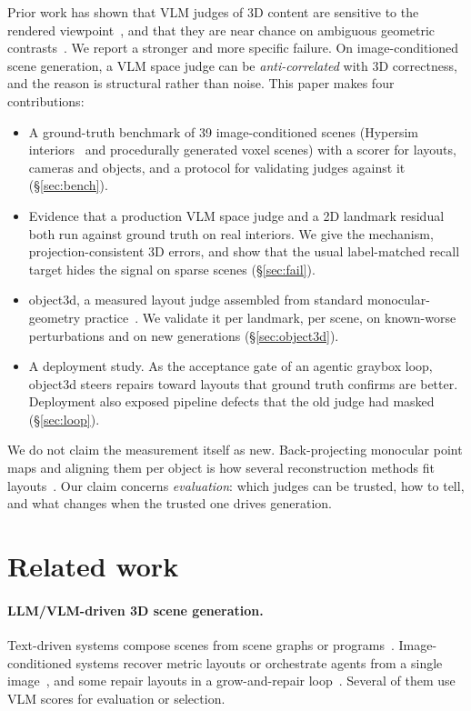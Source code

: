 \documentclass[10pt,twocolumn]{article}
\begin{document}
Prior work has shown that VLM judges of 3D content are sensitive to the rendered viewpoint~\cite{scenecritic}, and that they are near
chance on ambiguous geometric contrasts~\cite{crossmodeljudge}. We report a stronger and more specific failure. On image-conditioned
scene generation, a VLM space judge can be \emph{anti-correlated} with 3D correctness, and the reason is structural rather than
noise. This paper makes four contributions:
\begin{itemize}\setlength\itemsep{1pt}
\item A ground-truth benchmark of 39 image-conditioned scenes (Hypersim interiors~\cite{hypersim} and procedurally generated voxel
scenes) with a scorer for layouts, cameras and objects, and a protocol for validating judges against it (\S\ref{sec:bench}).
\item Evidence that a production VLM space judge and a 2D landmark residual both run against ground truth on real interiors. We give
the mechanism, projection-consistent 3D errors, and show that the usual label-matched recall target hides the signal on sparse scenes
(\S\ref{sec:fail}).
\item object3d, a measured layout judge assembled from standard monocular-geometry practice~\cite{moge2,furnset,mirascene}. We validate
it per landmark, per scene, on known-worse perturbations and on new generations (\S\ref{sec:object3d}).
\item A deployment study. As the acceptance gate of an agentic graybox loop, object3d steers repairs toward layouts that ground truth
confirms are better. Deployment also exposed pipeline defects that the old judge had masked (\S\ref{sec:loop}).
\end{itemize}
We do not claim the measurement itself as new. Back-projecting monocular point maps and aligning them per object is how several
reconstruction methods fit layouts~\cite{furnset,mirascene,easy3dfy}. Our claim concerns \emph{evaluation}: which judges can be
trusted, how to tell, and what changes when the trusted one drives generation.

\section{Related work}
\paragraph{LLM/VLM-driven 3D scene generation.} Text-driven systems compose scenes from scene graphs or programs~\cite{scenecraft,holodeck}.
Image-conditioned systems recover metric layouts or orchestrate agents from a single image~\cite{scenelm,sceneconductor}, and some
repair layouts in a grow-and-repair loop~\cite{scenepilot}. Several of them use VLM scores for evaluation or selection.
\end{document}
